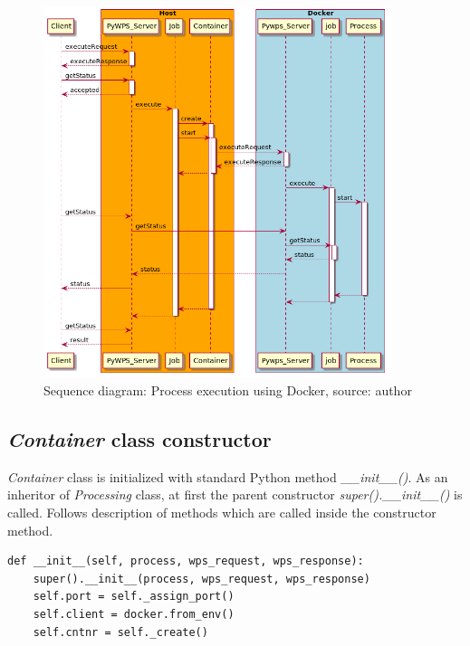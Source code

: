 \bigskip
\begin{figure}[h!]
\centering
\includegraphics[width=0.9\textwidth]{img/Diag_sequence.png}
\caption{Sequence diagram: Process execution using Docker, source: author}
\label{fig:Diag_sequence}
\end{figure}

\subsection{\textit{Container} class constructor}
\label{sub:Container_init}

\textit{Container} class is initialized with standard Python method
\textit{\_\_init\_\_()}. As an inheritor of \textit{Processing} class,
at first the parent constructor \textit{super().\_\_init\_\_()} is called. Follows description of methods
which are called inside the constructor method.

\bigskip
\begin{lstlisting}[basicstyle=\small,caption={\textit{Container} class constructor},label={lst:Container_constructor}]
def __init__(self, process, wps_request, wps_response):
    super().__init__(process, wps_request, wps_response)
    self.port = self._assign_port()
    self.client = docker.from_env()
    self.cntnr = self._create()
\end{lstlisting}

